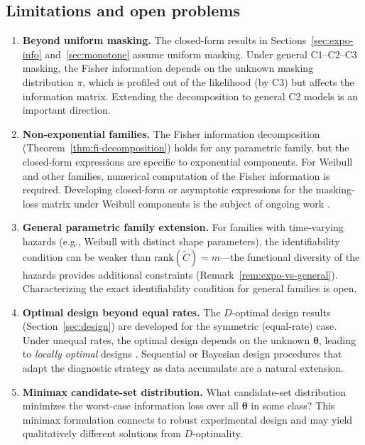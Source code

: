 \documentclass[11pt]{article}
\theoremstyle{definition}
\theoremstyle{plain}
\renewcommand{\v}[1]{\boldsymbol{#1}}
\newcommand{\btheta}{\v{\theta}}
\newcommand{\rank}{\mathrm{rank}}
\newcommand{\Ctilde}{\tilde{C}}
\begin{document}
\subsection{Limitations and open problems}

\begin{enumerate}
    \item \textbf{Beyond uniform masking.}
    The closed-form results in Sections~\ref{sec:expo-info}
    and~\ref{sec:monotone} assume uniform masking.
    Under general C1--C2--C3 masking, the Fisher information depends
    on the unknown masking distribution $\pi$, which is profiled out
    of the likelihood (by C3) but affects the information matrix.
    Extending the decomposition to general C2 models is an important
    direction.

    \item \textbf{Non-exponential families.}
    The Fisher information decomposition
    (Theorem~\ref{thm:fi-decomposition}) holds for any parametric
    family, but the closed-form expressions are specific to exponential
    components.
    For Weibull and other families, numerical computation of the Fisher
    information is required.
    Developing closed-form or asymptotic expressions for the
    masking-loss matrix under Weibull components is the subject of
    ongoing work \citep{towell2026weibull}.

    \item \textbf{General parametric family extension.}
    For families with time-varying hazards (e.g., Weibull with
    distinct shape parameters), the identifiability condition can be
    weaker than $\rank(\Ctilde) = m$---the functional diversity of
    the hazards provides additional constraints
    (Remark~\ref{rem:expo-vs-general}).
    Characterizing the exact identifiability condition for general
    families is open.

    \item \textbf{Optimal design beyond equal rates.}
    The $D$-optimal design results
    (Section~\ref{sec:design}) are developed for the symmetric
    (equal-rate) case.
    Under unequal rates, the optimal design depends on the unknown
    $\btheta$, leading to \emph{locally optimal} designs
    \citep{chernoff1953}.
    Sequential or Bayesian design procedures that adapt the diagnostic
    strategy as data accumulate are a natural extension.

    \item \textbf{Minimax candidate-set distribution.}
    What candidate-set distribution minimizes the worst-case
    information loss over all $\btheta$ in some class?
    This minimax formulation connects to robust experimental design
    and may yield qualitatively different solutions from
    $D$-optimality.
\end{enumerate}
\end{document}
